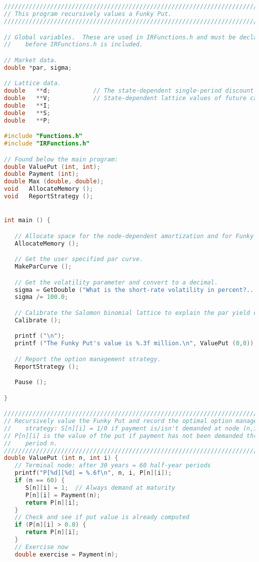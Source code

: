 \documentclass{report}
\begin{document}
\begin{lstlisting}[language=C++]


////////////////////////////////////////////////////////////////////////////////
// This program recursively values a Funky Put.
////////////////////////////////////////////////////////////////////////////////

// Global variables.  These are used in IRFunctions.h and must be declared
//    before IRFunctions.h is included.

// Market data.
double *par, sigma;

// Lattice data.
double   **d;            // The state-dependent single-period discount factors.
double   **V;            // State-dependent lattice values of future cash flow.
double   **I;
double   **S;
double   **P;

#include "Functions.h"
#include "IRFunctions.h"

// Found below the main program:
double ValuePut (int, int);
double Payment (int);
double Max (double, double);
void   AllocateMemory ();
void   ReportStrategy ();


int main () {

   // Allocate space for the node-dependent amortization and for Funky Put valuation.
   AllocateMemory ();

   // Get the user specified par curve.
   MakeParCurve ();

   // Get the volatility parameter and convert to a decimal.
   sigma = GetDouble ("What is the short-rate volatility in percent?... ");
   sigma /= 100.0;

   // Calibrate the Salomon binomial lattice to explain the par yield curve in par[].
   Calibrate ();

   printf ("\n");
   printf ("The Funky Put's value is %.3f million.\n", ValuePut (0,0));

   // Report the option management strategy.
   ReportStrategy ();

   Pause ();

}

////////////////////////////////////////////////////////////////////////////////
// Recursively value the Funky Put and record the optimal option management
//    strategy: S[n][i] = 1/0 if payment is/isn't demanded at node (n,i).
// P[n][i] is the value of the put if payment has not been demanded through
//    period n.
////////////////////////////////////////////////////////////////////////////////
double ValuePut (int n, int i) {
   // Terminal node: after 30 years = 60 half-year periods
   printf("P[%d][%d] = %.6f\n", n, i, P[n][i]);
   if (n == 60) {
      S[n][i] = 1;  // Always demand at maturity
      P[n][i] = Payment(n);
      return P[n][i];
   }
   // Check and see if put value is already computed
   if (P[n][i] > 0.0) {
      return P[n][i];
   }
   // Exercise now
   double exercise = Payment(n);


\end{lstlisting}
\end{document}
